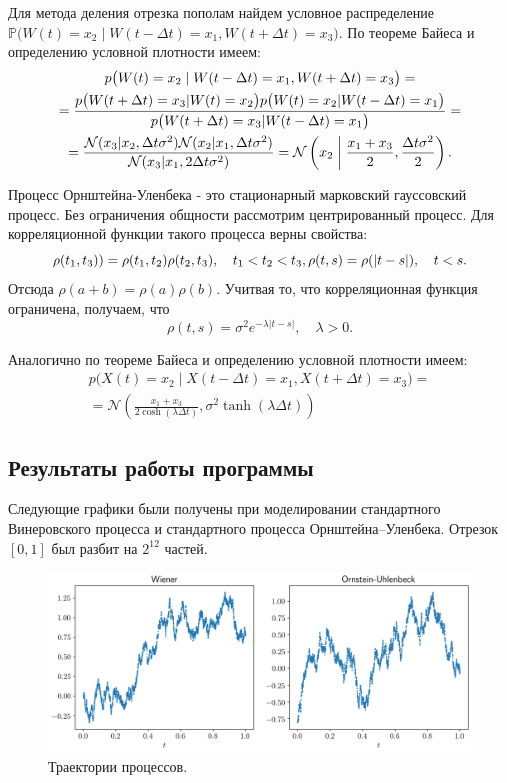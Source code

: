 \documentclass[12pt, a4paper]{article} %
\begin{document}
Для метода деления отрезка пополам найдем условное распределение $\mathbb{P}\bigl(W(t) = x_2 \mid W(t - \Delta t) = x_1, W(t + \Delta t) = x_3\bigr)$.
По теореме Байеса и определению условной плотности имеем:
\begin{multline*}
    p\bigl(W(t) = x_2 \mid W(t - \Delta t) = x_1, W(t + \Delta t) = x_3\bigr) = \\ =
    \frac{p\bigl(W(t + \Delta t) = x_3 | W(t) = x_2\bigr) p\bigl(W(t) = x_2 | W(t - \Delta t) = x_1\bigr)}{p\bigl(W(t + \Delta t) = x_3 | W(t - \Delta t) = x_1\bigr)} =\\
    =\frac{\mathcal{N}(x_3 | x_2, \Delta t \sigma^2)\mathcal{N}(x_2 | x_1, \Delta t \sigma^2)}{\mathcal{N}(x_3 | x_1, 2 \Delta t \sigma^2)} = \mathcal{N}\left(x_2 \biggm| \frac{x_1 + x_3}{2}, \frac{\Delta t \sigma^2}2\right).
\end{multline*}

Процесс Орнштейна-Уленбека - это стационарный марковский гауссовский процесс. Без ограничения общности рассмотрим центрированный процесс.
Для корреляционной функции такого процесса верны свойства:
$$
\rho(t_1, t_3)) = \rho(t_1, t_2)\rho(t_2, t_3), \quad t_1 < t_2 < t_3, \\
\rho(t, s) = \rho(|t - s|), \quad t < s.
$$
Отсюда $\rho(a + b) = \rho(a)\rho(b)$.
Учитвая то, что корреляционная функция ограничена, получаем, что
$$
\rho(t, s) = \sigma^2e^{-\lambda |t - s|}, \quad \lambda > 0.
$$

Аналогично по теореме Байеса и определению условной плотности имеем:
\begin{multline*}
    p\bigl(X(t) = x_2 \mid X(t - \Delta t) = x_1, X(t + \Delta t) = x_3\bigr) = \\ 
    =\mathcal{N}\left(\frac{x_1 + x_3}{2 \cosh (\lambda \Delta t)}, \sigma^2 \tanh (\lambda \Delta t) \right)
\end{multline*}

\subsection{Результаты работы программы}

Следующие графики были получены при моделировании стандартного Винеровского процесса и стандартного процесса Орнштейна--Уленбека.
Отрезок $[0, 1]$ был разбит на  $2^{12}$  частей.
\begin{figure}[H]
    \centering
    \includegraphics[width=\textwidth]{figures/09_proc.png}
    \caption{Траектории процессов.}
    \label{fig:09_proc}
\end{figure}
\end{document}
